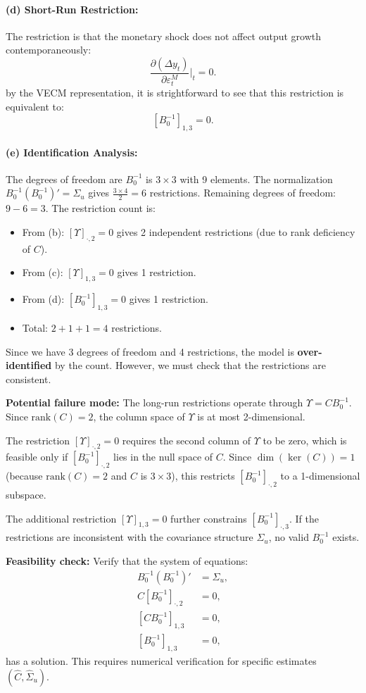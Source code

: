 \documentclass[12pt]{article}
\newcommand{\rank}{\mathrm{rank}}
\theoremstyle{definition}
\begin{document}
\paragraph{(d) Short-Run Restriction:} The restriction is that the monetary shock does not affect output growth contemporaneously:
\[
\frac{\partial (\Delta y_t)}{\partial \varepsilon_t^M}\Big|_t = 0.
\]
by the VECM representation, it is strightforward to see that this restriction is equivalent to:
\[
\boxed{[B_0^{-1}]_{1,3} = 0.}
\]

\paragraph{(e) Identification Analysis:}The degrees of freedom are $B_0^{-1}$ is $3 \times 3$ with 9 elements. The normalization $B_0^{-1} (B_0^{-1})' = \Sigma_u$ gives $\frac{3 \times 4}{2} = 6$ restrictions. Remaining degrees of freedom: $9 - 6 = 3$. The restriction count is:
\begin{itemize}
    \item From (b): $[\Upsilon]_{\cdot, 2} = 0$ gives 2 independent restrictions (due to rank deficiency of $C$).
    \item From (c): $[\Upsilon]_{1,3} = 0$ gives 1 restriction.
    \item From (d): $[B_0^{-1}]_{1,3} = 0$ gives 1 restriction.
    \item Total: $2 + 1 + 1 = 4$ restrictions.
\end{itemize}
Since we have 3 degrees of freedom and 4 restrictions, the model is \textbf{over-identified} by the count. However, we must check that the restrictions are consistent.

\textbf{Potential failure mode:} The long-run restrictions operate through $\Upsilon = C B_0^{-1}$. Since $\rank(C) = 2$, the column space of $\Upsilon$ is at most 2-dimensional. 

The restriction $[\Upsilon]_{\cdot, 2} = 0$ requires the second column of $\Upsilon$ to be zero, which is feasible only if $[B_0^{-1}]_{\cdot, 2}$ lies in the null space of $C$. Since $\dim(\ker(C)) = 1$ (because $\rank(C) = 2$ and $C$ is $3 \times 3$), this restricts $[B_0^{-1}]_{\cdot, 2}$ to a 1-dimensional subspace.

The additional restriction $[\Upsilon]_{1,3} = 0$ further constrains $[B_0^{-1}]_{\cdot, 3}$. If the restrictions are inconsistent with the covariance structure $\Sigma_u$, no valid $B_0^{-1}$ exists.

\textbf{Feasibility check:} Verify that the system of equations:
\begin{align*}
    B_0^{-1} (B_0^{-1})' &= \Sigma_u, \\
    C [B_0^{-1}]_{\cdot, 2} &= 0, \\
    [C B_0^{-1}]_{1,3} &= 0, \\
    [B_0^{-1}]_{1,3} &= 0,
\end{align*}
has a solution. This requires numerical verification for specific estimates $(\hat{C}, \hat{\Sigma}_u)$.
\end{document}
